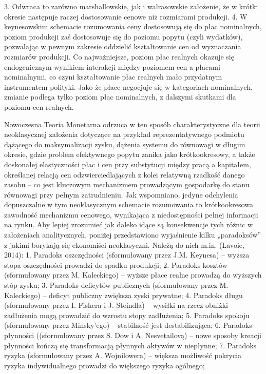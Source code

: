 \documentclass[
]{book}
\begin{document}
3. Odwraca to zarówno marshallowskie, jak i walrasowskie założenie, że w krótki okresie następuje raczej dostosowanie cenowe niż rozmiarami produkcji.
4. W keynesowskim schemacie rozumowania ceny dostosowują się do płac nominalnych, poziom produkcji zaś dostosowuje się do poziomu popytu (czyli wydatków), pozwalając w pewnym zakresie oddzielić kształtowanie cen od wyznaczania rozmiarów produkcji. Co najważniejsze, poziom płac realnych okazuje się endogenicznym wynikiem interakcji między poziomem cen a płacami nominalnymi, co czyni kształtowanie płac realnych mało przydatnym instrumentem polityki. Jako że płace negocjuje się w kategoriach nominalnych, zmianie podlega tylko poziom płac nominalnych, z dalszymi skutkami dla poziomu cen realnych.

Nowoczesna Teoria Monetarna odrzuca w ten sposób charakterystyczne dla teorii neoklasycznej założenia dotyczące na przykład reprezentatywnego podmiotu dążącego do maksymalizacji zysku, dążenia systemu do równowagi w długim okresie, gdzie problem efektywnego popytu zanika jako krótkookresowy, a także doskonałej elastyczności płac i cen przy substytucji między pracą a kapitałem, określanej relacją cen odzwierciedlających z kolei relatywną rzadkość danego zasobu -- co jest kluczowym mechanizmem prowadzącym gospodarkę do stanu równowagi przy pełnym zatrudnieniu. Jak wspomniano, jedyne odchylenia dopuszczalne w tym neoklasycznym schemacie rozumowania to krótkookresowa zawodność mechanizmu cenowego, wynikająca z niedostępności pełnej informacji na rynku.
Aby lepiej zrozumieć jak daleko idące są konsekwencje tych różnic w założeniach analitycznych, poniżej przedstawiono wyjaśnienie kilku „paradoksów'' z jakimi borykają się ekonomiści neoklasyczni. Należą do nich m.in. (Lavoie, 2014):
1. Paradoks oszczędności (sformułowany przez J.M. Keynesa) -- wyższa stopa oszczędności prowadzi do spadku produkcji;
2. Paradoks kosztów (sformułowany przez M. Kaleckiego) -- wyższe płace realne prowadzą do wyższych stóp zysku;
3. Paradoks deficytów publicznych (sformułowany przez M. Kaleckiego) -- deficyt publiczny zwiększa zyski prywatne;
4. Paradoks długu (sformułowany przez I. Fishera i J. Steindla) -- wysiłki na rzecz obniżki zadłużenia mogą prowadzić do wzrostu stopy zadłużenia;
5. Paradoks spokoju (sformułowany przez Minsky'ego) -- stabilność jest destabilizująca;
6. Paradoks płynności ((sformułowany przez S. Dow i A. Nesvetailovą) -- nowe sposoby kreacji płynności kończą się transformacją płynnych aktywów w niepłynne;
7. Paradoks ryzyka (sformułowany przez A. Wojnilowera) -- większa możliwość pokrycia ryzyka indywidualnego prowadzi do większego ryzyka ogólnego;
\end{document}
